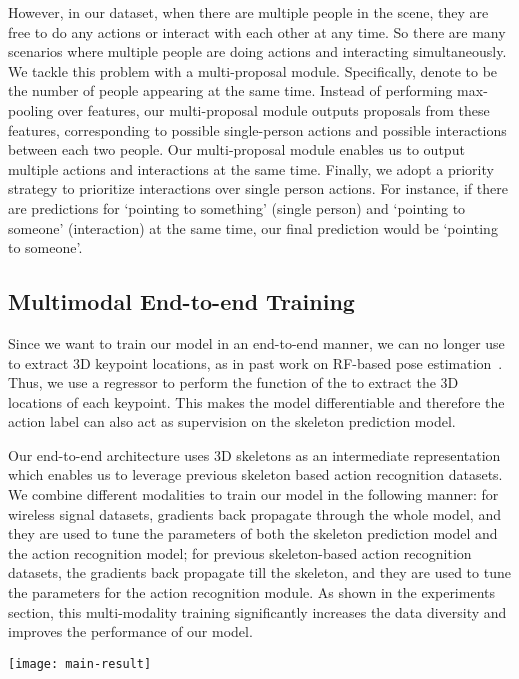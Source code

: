 \documentclass[10pt,twocolumn,letterpaper]{article}
\newcommand{\name} {RF-Action}
\begin{document}
However, in our dataset, when there are multiple people in the scene, they are free to do any actions or interact with each other at any time. So there are many scenarios where multiple people are doing actions and interacting simultaneously. We tackle this problem with a multi-proposal module. Specifically, denote  to be the number of people appearing at the same time. Instead of performing max-pooling over  features, our multi-proposal module outputs  proposals from these  features, corresponding to  possible single-person actions and  possible interactions between each two people. Our multi-proposal module enables us to output multiple actions and interactions at the same time. Finally, we adopt a priority strategy to prioritize interactions over single person actions. For instance, if there are predictions for `pointing to something' (single person) and `pointing to someone' (interaction) at the same time, our final prediction would be `pointing to someone'.



\subsection{Multimodal End-to-end Training}
Since we want to train our model in an end-to-end manner, we can no longer use  to extract 3D keypoint locations, as in past work on RF-based pose estimation~\cite{zhao2018rf}. Thus, we use a regressor to perform the function of the  to extract the 3D locations of each keypoint. This makes the model differentiable and therefore the action label can also act as supervision on the skeleton prediction model.

Our end-to-end architecture uses 3D skeletons as an intermediate representation which enables us to leverage previous skeleton based action recognition datasets. We combine different modalities to train our model in the following manner: for wireless signal datasets, gradients back propagate through the whole model, and they are used to tune the parameters of both the skeleton prediction model and the action recognition model; for previous skeleton-based action recognition datasets, the gradients back propagate till the skeleton, and they are used to tune the parameters for the action recognition module. As shown in the experiments section, this multi-modality training significantly increases the data diversity and improves the performance of our model. \begin{figure*}[t]
\begin{center}
\texttt{[image: main-result]}
\end{center}
\vspace{-10pt}
\caption{\footnotesize{Qualitative Results. The figure shows \name's output in various scenarios. The top two rows show our model's performance in visible scenes. The bottom two rows show our model's performance under partial/full occlusions and poor lighting conditions. The skeletons shown are the 2D projection of the intermediate 3D skeletons generated by our model.}}\label{fig:main}
\vspace{-10pt}
\end{figure*}
\end{document}
